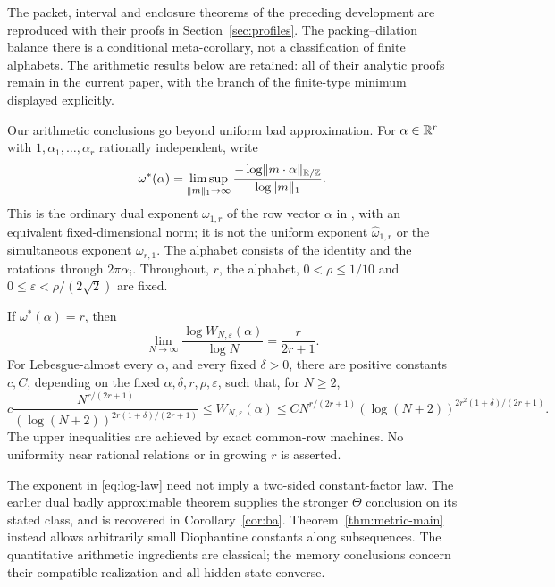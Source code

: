 The packet, interval and enclosure theorems of the preceding development
are reproduced with their proofs in Section~\ref{sec:profiles}.
The packing--dilation balance there is a conditional meta-corollary,
not a classification of finite alphabets. The arithmetic results below
are retained: all of their analytic proofs remain in the current paper,
with the branch of the finite-type minimum displayed explicitly.

Our arithmetic conclusions go beyond uniform bad approximation. For $\alpha\in\mathbb R^r$ with $1,\alpha_1,\ldots,\alpha_r$ rationally independent, write
\begin{equation}\label{eq:type-intro}
 \omega^*(\alpha)=\limsup_{\lVert m\rVert_1\to\infty}
       \frac{-\log\lVert m\cdot\alpha\rVert_{\mathbb R/\mathbb Z}}{\log\lVert m\rVert_1}.
\end{equation}
This is the ordinary dual exponent $\omega_{1,r}$ of the row vector $\alpha$ in \cite[Definition 1]{BL06}, with an equivalent fixed-dimensional norm; it is not the uniform exponent $\widehat\omega_{1,r}$ or the simultaneous exponent $\omega_{r,1}$. The alphabet consists of the identity and the rotations through $2\pi\alpha_i$. Throughout, $r$, the alphabet, $0<\rho\le1/10$ and
$0\le\varepsilon<\rho/(2\sqrt2)$ are fixed.

\begin{theorem}\label{thm:metric-main}
If $\omega^*(\alpha)=r$, then
\begin{equation}\label{eq:log-law}
 \lim_{N\to\infty}\frac{\log W_{N,\varepsilon}(\alpha)}{\log N}
                         =\frac{r}{2r+1}.
\end{equation}
For Lebesgue-almost every $\alpha$, and every fixed $\delta>0$, there are positive constants $c,C$, depending on the fixed $\alpha,\delta,r,\rho,\varepsilon$, such that, for $N\ge2$,
\begin{equation}\label{eq:ae-log-bounds}
 c\frac{N^{r/(2r+1)}}{(\log(N+2))^{2r(1+\delta)/(2r+1)}}
 \le W_{N,\varepsilon}(\alpha)
 \le C N^{r/(2r+1)}(\log(N+2))^{2r^2(1+\delta)/(2r+1)}.
\end{equation}
The upper inequalities are achieved by exact common-row machines. No uniformity near rational relations or in growing $r$ is asserted.
\end{theorem}

The exponent in \eqref{eq:log-law} need not imply a two-sided constant-factor law. The earlier dual badly approximable theorem supplies the stronger $\Theta$ conclusion on its stated class, and is recovered in Corollary~\ref{cor:ba}. Theorem~\ref{thm:metric-main} instead allows arbitrarily small Diophantine constants along subsequences. The quantitative arithmetic ingredients are classical; the memory conclusions concern their compatible realization and all-hidden-state converse.

